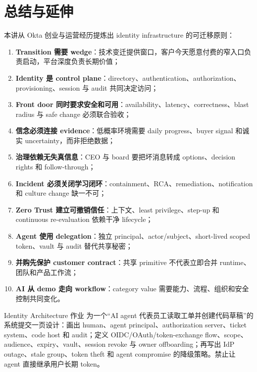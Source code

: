 \section{总结与延伸}

本讲从 Okta 创业与运营经历提炼出 identity infrastructure 的可迁移原则：

\begin{enumerate}
  \item \textbf{Transition 需要 wedge}：技术变迁提供窗口，客户今天愿意付费的窄入口负责启动，平台深度负责长期价值；
  \item \textbf{Identity 是 control plane}：directory、authentication、authorization、provisioning、session 与 audit 共同决定访问；
  \item \textbf{Front door 同时要求安全和可用}：availability、latency、correctness、blast radius 与 safe change 必须联合验收；
  \item \textbf{信念必须连接 evidence}：低概率环境需要 daily progress、buyer signal 和诚实 uncertainty，而非拒绝数据；
  \item \textbf{治理依赖无失真信息}：CEO 与 board 要把坏消息转成 options、decision rights 和 follow-through；
  \item \textbf{Incident 必须关闭学习闭环}：containment、RCA、remediation、notification 和 culture change 缺一不可；
  \item \textbf{Zero Trust 建立可撤销信任}：上下文、least privilege、step-up 和 continuous re-evaluation 依赖干净 lifecycle；
  \item \textbf{Agent 使用 delegation}：独立 principal、actor/subject、short-lived scoped token、vault 与 audit 替代共享秘密；
  \item \textbf{并购先保护 customer contract}：共享 primitive 不代表立即合并 runtime、团队和产品工作流；
  \item \textbf{AI 从 demo 走向 workflow}：category value 需要能力、流程、组织和安全控制共同变化。
\end{enumerate}

\begin{importantbox}{Identity Architecture 作业}
为一个“AI agent 代表员工读取工单并创建代码草稿”的系统提交一页设计：画出 human、agent principal、authorization server、ticket system、code host 和 audit；定义 OIDC/OAuth/token-exchange flow、scope、audience、expiry、vault、session revoke 与 owner offboarding；再写出 IdP outage、stale group、token theft 和 agent compromise 的降级策略。禁止让 agent 直接继承用户长期 token。
\end{importantbox}

